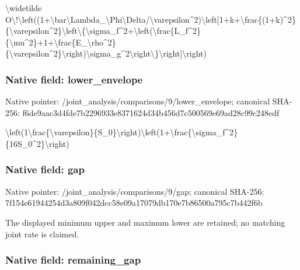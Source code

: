 \documentclass[10pt,a4paper]{article}
\begin{document}
\textbackslash{}widetilde O\textbackslash{}!\textbackslash{}left((1+\textbackslash{}bar\textbackslash{}Lambda\_\allowbreak{}\textbackslash{}Phi\textbackslash{}Delta/\textbackslash{}varepsilon\textasciicircum{}2\allowbreak{})\textbackslash{}left[1+k+\textbackslash{}frac\{(1+k)\textasciicircum{}2\allowbreak{}\}\{\textbackslash{}varepsilon\textasciicircum{}2\}\textbackslash{}left\textbackslash{}\{\textbackslash{}\allowbreak{}sigma\_f\textasciicircum{}2+\textbackslash{}left(\textbackslash{}frac\{L\_\allowbreak{}f\textasciicircum{}2\}\{\textbackslash{}mu\textasciicircum{}2\}+1+\textbackslash{}frac\{E\_\textbackslash{}r\allowbreak{}ho\textasciicircum{}2\}\{\textbackslash{}varepsilon\textasciicircum{}2\}\textbackslash{}rig\allowbreak{}ht)\textbackslash{}sigma\_g\textasciicircum{}2\textbackslash{}right\textbackslash{}\}\textbackslash{}ri\allowbreak{}ght]\textbackslash{}right)


\subsubsection{Native field: lower\_envelope}


Native pointer: /joint\_analysis/comparis\allowbreak{}ons/9/lower\_envelope; canonical SHA-256: f6de9aac3d4fde7b2296933e\allowbreak{}8371624d34b456d7c500569e\allowbreak{}69ad28c99c248edf


\textbackslash{}left(1\textbackslash{}frac\{\textbackslash{}varepsilo\allowbreak{}n\}\{S\_0\}\textbackslash{}right)\textbackslash{}left(1+\textbackslash{}f\allowbreak{}rac\{\textbackslash{}sigma\_f\textasciicircum{}2\}\{16S\_0\textasciicircum{}2\}\allowbreak{}\textbackslash{}right)


\subsubsection{Native field: gap}


Native pointer: /joint\_analysis/comparisons/9/gap; canonical SHA-256: 7f154e61944254d3a809f042\allowbreak{}dcc58e09a17079db170e7b86\allowbreak{}500a795c7b442f6b


The displayed minimum upper and maximum lower are retained; no matching joint rate is claimed.


\subsubsection{Native field: remaining\_gap}
\end{document}

